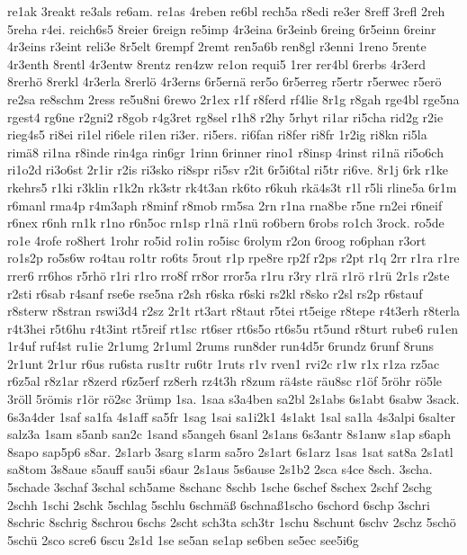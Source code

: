 {re1ak 3reakt re3als re6am.  re1as 4reben re6bl rech5a r8edi re3er
8reff 3refl 2reh 5reha r4ei.  reich6s5 8reier 6reign re5imp 4r3eina
6r3einb 6reing 6r5einn 6reinr 4r3eins r3eint reli3e 8r5elt 6rempf
2remt ren5a6b ren8gl r3enni 1reno 5rente 4r3enth 8rentl 4r3entw 8rentz
ren4zw re1on requi5 1rer rer4bl 6rerbs 4r3erd 8rerh\"o 8rerkl
4r3erla 8rerl\"o 4r3erns 6r5ern\"a rer5o 6r5erreg r5ertr r5erwec
r5er\"o re2sa re8schm 2ress re5u8ni 6rewo 2r1ex r1f r8ferd rf4lie
8r1g r8gah rge4bl rge5na rgest4 rg6ne r2gni2 r8gob r4g3ret rg8sel r1h8
r2hy 5rhyt ri1ar ri5cha rid2g r2ie rieg4s5 ri8ei ri1el ri6ele ri1en
ri3er.  ri5ers.  ri6fan ri8fer ri8fr 1r2ig ri8kn ri5la rim\"a8
ri1na r8inde rin4ga rin6gr 1rinn 6rinner rino1 r8insp 4rinst
ri1n\"a ri5o6ch ri1o2d ri3o6st 2r1ir r2is ri3sko ri8spr 
ri5sv r2it 6r5i6tal ri5tr ri6ve.  8r1j 6rk r1ke rkehrs5 r1ki r3klin
r1k2n rk3str rk4t3an rk6to r6kuh rk\"a4s3t r1l r5li rline5a 6r1m
r6manl rma4p r4m3aph r8minf r8mob rm5sa 2rn r1na rna8be r5ne rn2ei
r6neif r6nex r6nh rn1k r1no r6n5oc rn1sp r1n\"a r1n\"u ro6bern
6robs ro1ch 3rock.  ro5de ro1e 4rofe ro8hert 1rohr ro5id ro1in ro5isc
6rolym r2on 6roog ro6phan r3ort ro1s2p ro5s6w ro4tau ro1tr ro6ts 5rout
r1p rpe8re rp2f r2ps r2pt r1q 2rr r1ra r1re rrer6 
rr6hos r5rh\"o
r1ri r1ro rro8f rr8or rror5a r1ru r3ry r1r\"a r1r\"o r1r\"u
2r1s 
r2ste r2sti %
r6sab r4sanf rse6e rse5na r2sh r6ska r6ski rs2kl r8sko r2sl rs2p
r6stauf r8sterw r8stran rswi3d4 r2sz 2r1t rt3art r8taut r5tei rt5eige
r8tepe r4t3erh r8terla r4t3hei r5t6hu r4t3int rt5reif rt1sc rt6ser
rt6s5o rt6s5u rt5und r8turt rube6 ru1en 1r4uf ruf4st ru1ie 2r1umg
2r1uml 2rums run8der run4d5r 6rundz 6runf 8runs 2r1unt 2r1ur r6us
ru6sta 
rus1tr %
ru6tr 1ruts r1v rven1 rvi2c r1w r1x r1za rz5ac r6z5al
r8z1ar r8zerd r6z5erf rz8erh rz4t3h r8zum r\"a4ste r\"au8sc
r1\"of 5r\"ohr r\"o5le 3r\"oll 5r\"omis r1\"or
r\"o2sc 3r\"ump 1sa.  1saa s3a4ben sa2bl 2s1abs 6s1abt 6sabw
3sack.  6s3a4der 1saf sa1fa 4s1aff sa5fr 1sag 1sai sa1i2k1 4s1akt 1sal
sa1la 4s3alpi 6salter salz3a 1sam s5anb san2c 1sand s5angeh 6sanl
2s1ans 6s3antr 8s1anw s1ap s6aph 8sapo sap5p6 s8ar.  2s1arb 3sarg
s1arm sa5ro 2s1art 6s1arz 1sas 1sat sat8a 2s1atl sa8tom 3s8aue s5auff
sau5i s6aur 2s1aus 5s6ause 2s1b2 2sca s4ce 8sch.  3scha.  5schade
3schaf 3schal sch5ame 8schanc 8schb 1sche 6schef 8schex 2schf 2schg
2schh 1schi 2schk 5schlag 5schlu 6schm\"a\ss 
6schna\ss  1scho 6schord 6schp 3schri 8schric 8schrig
8schrou 6schs 2scht sch3ta sch3tr 1schu 8schunt 6schv 2schz 5sch\"o
5sch\"u 2sco scre6 6scu 2s1d 1se se5an se1ap se6ben se5ec see5i6g
}
